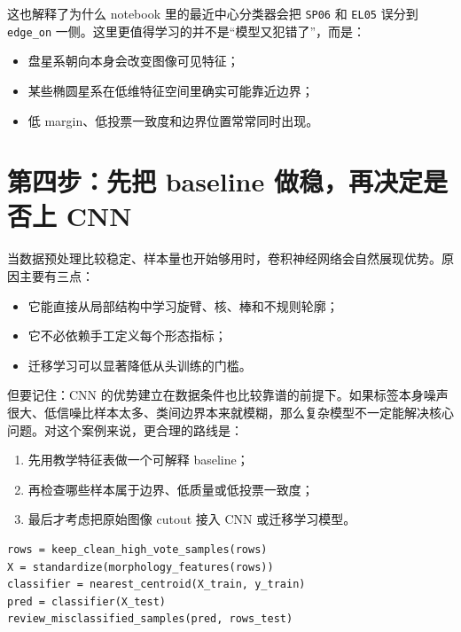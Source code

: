 这也解释了为什么 notebook 里的最近中心分类器会把 \texttt{SP06} 和 \texttt{EL05} 误分到 \texttt{edge\_on} 一侧。这里更值得学习的并不是“模型又犯错了”，而是：

\begin{itemize}
    \item 盘星系朝向本身会改变图像可见特征；
    \item 某些椭圆星系在低维特征空间里确实可能靠近边界；
    \item 低 margin、低投票一致度和边界位置常常同时出现。
\end{itemize}

\section{第四步：先把 baseline 做稳，再决定是否上 CNN}

当数据预处理比较稳定、样本量也开始够用时，卷积神经网络会自然展现优势。原因主要有三点：

\begin{itemize}
    \item 它能直接从局部结构中学习旋臂、核、棒和不规则轮廓；
    \item 它不必依赖手工定义每个形态指标；
    \item 迁移学习可以显著降低从头训练的门槛。
\end{itemize}

但要记住：CNN 的优势建立在数据条件也比较靠谱的前提下。如果标签本身噪声很大、低信噪比样本太多、类间边界本来就模糊，那么复杂模型不一定能解决核心问题。对这个案例来说，更合理的路线是：

\begin{enumerate}
    \item 先用教学特征表做一个可解释 baseline；
    \item 再检查哪些样本属于边界、低质量或低投票一致度；
    \item 最后才考虑把原始图像 cutout 接入 CNN 或迁移学习模型。
\end{enumerate}

\begin{examplebox}
\begin{lstlisting}[style=pythonstyle]
rows = keep_clean_high_vote_samples(rows)
X = standardize(morphology_features(rows))
classifier = nearest_centroid(X_train, y_train)
pred = classifier(X_test)
review_misclassified_samples(pred, rows_test)
\end{lstlisting}
\end{examplebox}

